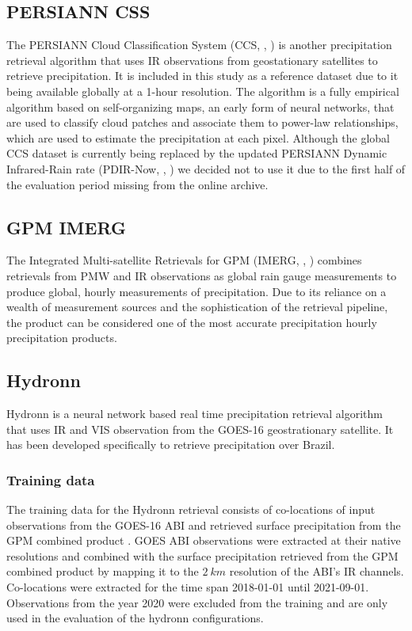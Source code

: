 \documentclass[journal abbreviation, manuscript]{copernicus}
\begin{document}
\subsection{PERSIANN CSS}

The PERSIANN Cloud Classification System (CCS, \citeauthor{hong04},
\citeyear{hong04}) is another precipitation retrieval algorithm that uses IR
observations from geostationary satellites to retrieve precipitation. It is
included in this study as a reference dataset due to it being available globally
at a 1-hour resolution. The algorithm is a fully empirical algorithm based on
self-organizing maps, an early form of neural networks, that are used to
classify cloud patches and associate them to power-law relationships, which are
used to estimate the precipitation at each pixel. Although the global CCS
dataset is currently being replaced by the updated PERSIANN Dynamic
Infrared-Rain rate (PDIR-Now, \citeauthor{nguyen20}, \citeyear{nguyen20}) we
decided not to use it due to the first half of the evaluation period missing
from the online archive.


\subsection{GPM IMERG}

The Integrated Multi-satellite Retrievals for GPM (IMERG,
\citeauthor{huffman15}, \citeyear{huffman15}) combines retrievals from PMW
and IR observations as global rain gauge measurements to produce global,
hourly measurements of precipitation. Due to its reliance on a wealth of
measurement sources and the sophistication of the retrieval pipeline, the
product can be considered one of the most accurate precipitation hourly
precipitation products. 

\subsection{Hydronn}

Hydronn is a neural network based real time precipitation retrieval algorithm
that uses IR and VIS observation from the GOES-16 geostrationary satellite. It
has been developed specifically to retrieve precipitation over Brazil.

\subsubsection{Training data}

The training data for the Hydronn retrieval consists of co-locations of input
observations from the GOES-16 ABI \citep{schmit18} and retrieved surface
precipitation from the GPM combined product \citep{grecu16}. GOES ABI
observations were extracted at their native resolutions and combined with the
surface precipitation retrieved from the GPM combined product by mapping it to
the $2\ \unit{km}$ resolution of the ABI's IR channels. Co-locations were
extracted for the time span 2018-01-01 until 2021-09-01. Observations from the
year 2020 were excluded from the training and are only used in the evaluation of
the hydronn configurations.
\end{document}
